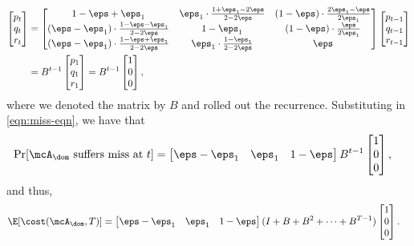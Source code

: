 \documentclass[11pt]{article}
\begin{document}
\begin{align*}
    \begin{bmatrix}
        p_t \\ q_t \\ r_t
    \end{bmatrix}
    &=
    \begin{bmatrix}
       1-\eps+\eps_1  & \eps_1 \cdot \frac{1+\eps_1-2\eps}{2-2\eps} & (1-\eps) \cdot \frac{2\eps_1-\eps}{2\eps_1} \\
       (\eps-\eps_1) \cdot \frac{1-\eps-\eps_1}{2-2\eps} & 1-\eps_1 & (1-\eps) \cdot \frac{\eps}{2\eps_1} \\
       (\eps-\eps_1) \cdot \frac{1-\eps+\eps_1}{2-2\eps} & \eps_1 \cdot \frac{1-\eps_1}{2-2\eps} & \eps
    \end{bmatrix}
    \begin{bmatrix}
        p_{t-1} \\ q_{t-1} \\ r_{t-1}
    \end{bmatrix} \\
    &= B^{t-1} \begin{bmatrix}
        p_{1} \\ q_{1} \\ r_{1}
    \end{bmatrix}
    = B^{t-1} \begin{bmatrix}
        1 \\ 0 \\ 0
    \end{bmatrix},
\end{align*}
where we denoted the matrix by $B$ and rolled out the recurrence. Substituting in \eqref{eqn:miss-eqn}, we have that
\begin{align*}
    \Pr[\mcA_\dom \text{ suffers miss at }t] &= 
    \begin{bmatrix}
        \eps-\eps_1 & \eps_1 & 1-\eps
    \end{bmatrix}
    B^{t-1} \begin{bmatrix}
        1 \\ 0 \\ 0
    \end{bmatrix},
\end{align*}
and thus,
\begin{align}
    \E[\cost(\mcA_\dom, T)] &= \begin{bmatrix}
        \eps-\eps_1 & \eps_1 & 1-\eps
    \end{bmatrix}
    (I + B + B^2 + \dots + B^{T-1}) \begin{bmatrix}
        1 \\ 0 \\ 0
    \end{bmatrix}. \label{eqn:dom-gen-misses}
\end{align}
\end{document}
